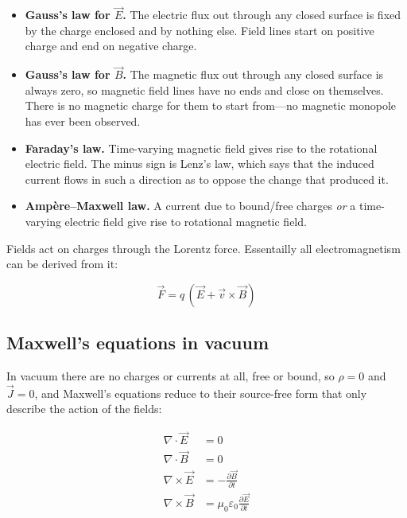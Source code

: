         \begin{itemize}
            \item \textbf{Gauss's law for $\vec{E}$.} The electric flux out through any closed surface is fixed by the charge enclosed and by nothing else. Field lines start on positive charge and end on negative charge.
            \item \textbf{Gauss's law for $\vec{B}$.} The magnetic flux out through any closed surface is always zero, so magnetic field lines have no ends and close on themselves. There is no magnetic charge for them to start from---no magnetic monopole has ever been observed.
            \item \textbf{Faraday's law.} Time-varying magnetic field gives rise to the rotational electric field. The minus sign is Lenz's law, which says that the induced current flows in such a direction as to oppose the change that produced it.
            \item \textbf{Ampère--Maxwell law.} A current due to bound/free charges \emph{or} a time-varying electric field give rise to rotational magnetic field.
        \end{itemize}

        Fields act on charges through the Lorentz force. Essentailly all electromagnetism can be derived from it:

        \begin{equation}\label{eq:lorentz-force}
            \vec{F}=q\,(\vec{E}+\vec{v}\times\vec{B})
        \end{equation}

    \subsection{Maxwell's equations in vacuum}

        In vacuum there are no charges or currents at all, free or bound, so $\rho = 0$ and $\vec{J} = 0$, and Maxwell's equations reduce to their source-free form that only describe the action of the fields:

        \begin{equation}\label{eq:maxwell-vacuum}
            \begin{aligned}
                \nabla \cdot \vec{E}  & = 0\\
                \nabla \cdot \vec{B}  & = 0\\
                \nabla \times \vec{E} & = -\frac{\partial \vec{B}}{\partial t}\\
                \nabla \times \vec{B} & = \mu_{0}\varepsilon_{0}\frac{\partial\vec{E}}{\partial t}
            \end{aligned}
        \end{equation}


